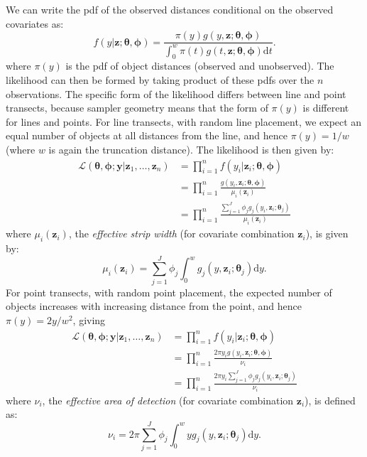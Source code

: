 \documentclass[10pt]{article}
\begin{document}
We can write the pdf of the observed distances conditional on the observed covariates as\cite{Buckland:2004ts}:
\begin{equation*}
f(y \vert \mathbf{z}; \boldsymbol{\theta}, \boldsymbol{\phi}) = \frac{\pi(y)g(y, \mathbf{z}; \boldsymbol{\theta}, \boldsymbol{\phi})}{\int_0^w \pi(t)g(t, \mathbf{z}; \boldsymbol{\theta}, \boldsymbol{\phi}) \text{d}t}.
\end{equation*}
where $\pi(y)$ is the pdf of object distances (observed and unobserved). The likelihood can then be formed by taking product of these pdfs over the $n$ observations.  The specific form of the likelihood differs between line and point transects, because sampler geometry means that the form of $\pi(y)$ is different for lines and points.  For line transects, with random line placement, we expect an equal number of objects at all distances from the line, and hence $\pi(y)=1/w$ (where $w$ is again the truncation distance).  The likelihood is then given by:
\begin{align*}
\mathcal{L}(\boldsymbol{\theta},\boldsymbol{\phi}; \mathbf{y} \vert \mathbf{z}_1, \ldots, \mathbf{z}_n) &= \prod_{i=1}^n f(y_i \vert \mathbf{z}_i; \boldsymbol{\theta},\boldsymbol{\phi})\\
&= \prod_{i=1}^n \frac{g(y_i,\mathbf{z}_i; \boldsymbol{\theta},\boldsymbol{\phi})}{\mu_i(\mathbf{z}_i)}\\
&= \prod_{i=1}^n \frac{\sum_{j=1}^J \phi_j g_j(y_i,\mathbf{z}_i; \boldsymbol{\theta}_j)}{\mu_i(\mathbf{z}_i)}
\end{align*}
where $\mu_i(\mathbf{z}_i)$, the \textit{effective strip width} (for covariate combination $\mathbf{z}_i$), is given by:
\begin{equation}
\label{e:esw}
\mu_{i}(\mathbf{z}_i) = \sum_{j=1}^J \phi_j \int_0^w  g_j(y,\mathbf{z}_i; \boldsymbol{\theta}_j) \text{d}y.
\end{equation}
For point transects, with random point placement, the expected number of objects increases with increasing distance from the point, and hence $\pi(y)=2y/w^2$, giving
\begin{align*}
\mathcal{L}(\boldsymbol{\theta},\boldsymbol{\phi}; \mathbf{y}  \vert \mathbf{z}_1, \ldots, \mathbf{z}_n) &= \prod_{i=1}^n f(y_i \vert \mathbf{z}_i; \boldsymbol{\theta},\boldsymbol{\phi})\\
&= \prod_{i=1}^n \frac{2 \pi y_i g(y_i,\mathbf{z}_i; \boldsymbol{\theta},\boldsymbol{\phi})}{\nu_i}\\
&= \prod_{i=1}^n \frac{2 \pi y_i \sum_{j=1}^J \phi_j g_j(y_i,\mathbf{z}_i; \boldsymbol{\theta}_j)}{\nu_i}
\end{align*}
where $\nu_i$, the \textit{effective area of detection} (for covariate combination $\mathbf{z}_i$), is defined as:
\begin{equation}
\label{e:ead}
\nu_i = 2\pi \sum_{j=1}^J \phi_j \int_0^w  y g_j(y,\mathbf{z}_i; \boldsymbol{\theta}_j) \text{d}y.
\end{equation}
\end{document}
